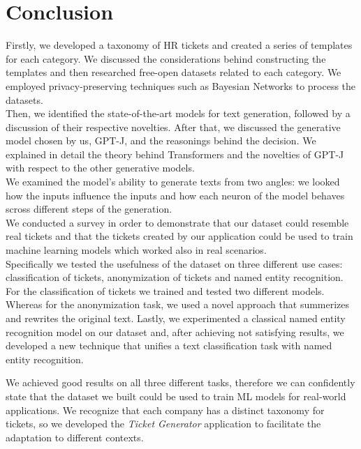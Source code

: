 \chapter{Conclusion}
\label{sec:conclusion}

Firstly, we developed a taxonomy of HR tickets and created a series of templates for each category. We discussed the considerations behind constructing the templates and then researched free-open datasets related to each category. We employed privacy-preserving techniques such as Bayesian Networks to process the datasets. \\
Then, we identified the state-of-the-art models for text generation, followed by a discussion of their respective novelties. After that, we discussed the generative model chosen by us, GPT-J, and the reasonings behind the decision. We explained in detail the theory behind Transformers and the novelties of GPT-J with respect to the other generative models. \\
We examined the model's ability to generate texts from two angles: we looked how the inputs influence the inputs and how each neuron of the model behaves scross different steps of the generation. \\
We conducted a survey in order to demonstrate that our dataset could resemble real tickets and that the tickets created by our application could be used to train machine learning models which worked also in real scenarios. \\
Specifically we tested the usefulness of the dataset on three different use cases: classification of tickets, anonymization of tickets and named entity recognition. \\
For the classification of tickets we trained and tested two different models. 
Whereas for the anonymization task, we used a novel approach that summerizes and rewrites the original text. Lastly, we experimented a classical named entity recognition model on our dataset and, after achieving not satisfying results, we developed a new technique that unifies a text classification task with named entity recognition.

We achieved good results on all three different tasks, therefore we can confidently state that the dataset we built could be used to train ML models for real-world applications. We recognize that each company has a distinct taxonomy for tickets, so we developed the \textit{Ticket Generator} application to facilitate the adaptation to different contexts.